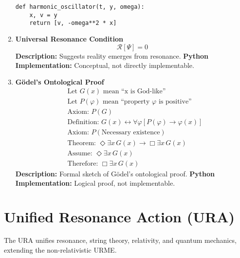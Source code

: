 \documentclass[12pt]{article}
\begin{document}
\begin{enumerate}
\begin{lstlisting}
def harmonic_oscillator(t, y, omega):
    x, v = y
    return [v, -omega**2 * x]
    \end{lstlisting}


    \item \textbf{Universal Resonance Condition}
    \[
    \mathcal{R}[\Psi] = 0 \tag{55}
    \]
    \textbf{Description:} Suggests reality emerges from resonance.
    \textbf{Python Implementation:} Conceptual, not directly implementable.

    \item \textbf{Gödel’s Ontological Proof}
    \[
    \begin{aligned}
        &\text{Let } G(x) \text{ mean ``x is God-like''} \\
        &\text{Let } P(\varphi) \text{ mean ``property } \varphi \text{ is positive''} \\
        &\text{Axiom: } P(G) \\
        &\text{Definition: } G(x) \leftrightarrow \forall \varphi [P(\varphi) \rightarrow \varphi(x)] \\
        &\text{Axiom: } P(\text{Necessary existence}) \\
        &\text{Theorem: } \Diamond \exists x\, G(x) \rightarrow \Box \exists x\, G(x) \\
        &\text{Assume: } \Diamond \exists x\, G(x) \\
        &\text{Therefore: } \Box \exists x\, G(x)
    \end{aligned} \tag{56}
    \]
    \textbf{Description:} Formal sketch of Gödel’s ontological proof.
    \textbf{Python Implementation:} Logical proof, not implementable.
\end{enumerate}

\section*{Unified Resonance Action (URA)}

The URA unifies resonance, string theory, relativity, and quantum mechanics, extending the non-relativistic URME.

\begin{tcolorbox}[colback=green!5!white, colframe=green!75!black, title=Unified Action]
\end{tcolorbox}
\end{document}
